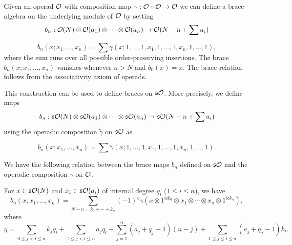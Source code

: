 \documentclass[join.tex]{subfiles}
\begin{document}
Given an operad ${\mathcal O}$ with composition map $\gamma:{\mathcal O}\circ{\mathcal O}\to{\mathcal O}$ we can define a brace algebra on the underlying module of ${\mathcal O}$ by setting
\[b_n:{\mathcal O}(N)\otimes{\mathcal O}(a_1)\otimes\cdots\otimes{\mathcal O}(a_n)\to{\mathcal O}(N-n+\sum a_i)\]

\[b_n(x;x_1,\dots, x_n)=\sum\gamma(x;1,\dots,1,x_1,1,\dots,1,x_n,1,\dots,1),\]
where the sum runs over all possible order-preserving insertions. The brace $b_n(x;x_1,\dots,x_n)$ vanishes whenever $n>N$ and $b_0(x)=x$. The brace relation follows from the associativity axiom of operads.


This construction can  be used to define braces on $\mathfrak{s}{\mathcal O}$. More precisely, we define maps 
\[b_n:\mathfrak{s}{\mathcal O}(N)\otimes\mathfrak{s}{\mathcal O}(a_1)\otimes\cdots\otimes\mathfrak{s}{\mathcal O}(a_n)\to\mathfrak{s}{\mathcal O}(N-n+\sum a_i)\]
using the operadic composition $\tilde{\gamma}$ on $\mathfrak{s}{\mathcal O}$ as

\[b_n(x;x_1,\dots,x_n)=\sum\tilde{\gamma}(x;1,\dots,1,x_1,1,\dots,1,x_n,1,\dots,1).\]

We have the following relation between the brace maps $b_n$ defined on $\mathfrak{s}{\mathcal O}$ and the operadic composition $\gamma$ on ${\mathcal O}$. 
\begin{propo}\label{bracesign}
For $x\in \mathfrak{s}{\mathcal O}(N)$ and $x_i\in\mathfrak{s}{\mathcal O}(a_i)$ of internal degree $q_i$ ($1\leq i\leq n$), we have
\[b_n(x;x_1,\dots,x_n)=\sum_{N-n=k_0+\cdots+k_n} (-1)^\eta \gamma
(x\otimes 1^{\otimes k_0}\otimes x_1\otimes \cdots\otimes x_n\otimes1^{\otimes k_n}),\]
where 
\[\eta=\sum_{0\leq j<l\leq n}k_jq_l+\sum_{1\leq j<l\leq n}a_jq_l+\sum_{j=1}^n (a_j+q_j-1)(n-j)+\sum_{1\leq j\leq l\leq n} (a_j+q_j-1)k_l.\]
\end{propo}
\end{document}
